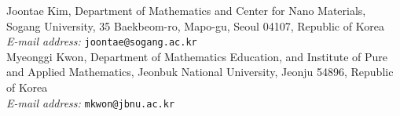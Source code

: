 \documentclass[12pt]{article}
\theoremstyle{theorem}
\theoremstyle{definition}
\theoremstyle{remark}
\numberwithin{equation}{section}
\begin{document}
\noindent
\small
{Joontae Kim, Department of Mathematics and Center for Nano Materials, Sogang University, 35 Baekbeom-ro, Mapo-gu, Seoul 04107, Republic of Korea\vspace{0.1cm}\\
\emph{E-mail address: }\texttt{joontae@sogang.ac.kr}\vspace{0.4cm}\\
Myeonggi Kwon, Department of Mathematics Education, and Institute of Pure and Applied Mathematics, Jeonbuk National University, Jeonju 54896, Republic of Korea\vspace{0.1cm}\\
\emph{E-mail address: }\texttt{mkwon@jbnu.ac.kr}
}

\end{document}
